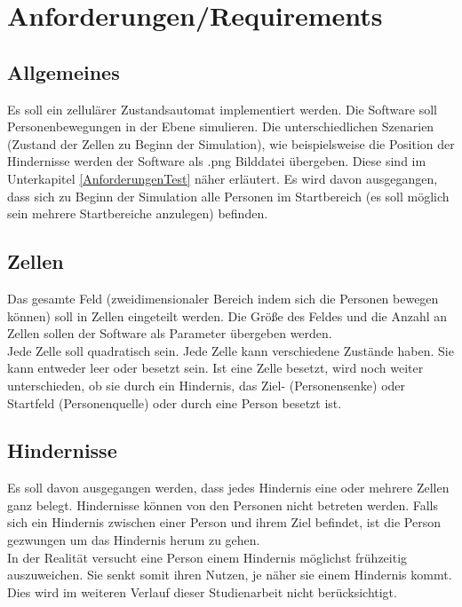 \section{Anforderungen/Requirements}
\label{requirements}

\subsection{Allgemeines}
Es soll ein zellulärer Zustandsautomat implementiert werden. Die Software soll Personenbewegungen in der Ebene simulieren. Die unterschiedlichen Szenarien (Zustand der Zellen zu Beginn der Simulation), wie beispielsweise die Position der Hindernisse werden der Software als .png Bilddatei übergeben. Diese sind im Unterkapitel \ref{AnforderungenTest} näher erläutert. Es wird davon ausgegangen, dass sich zu Beginn der Simulation alle Personen im Startbereich (es soll möglich sein mehrere Startbereiche anzulegen) befinden.



\subsection{Zellen}
Das gesamte Feld (zweidimensionaler Bereich indem sich die Personen bewegen können) soll in Zellen eingeteilt werden. Die Größe des Feldes und die Anzahl an Zellen sollen der Software als Parameter übergeben werden.\\
Jede Zelle soll quadratisch sein. Jede Zelle kann verschiedene Zustände haben. Sie kann entweder leer oder besetzt sein. Ist eine Zelle besetzt, wird noch weiter unterschieden, ob sie durch ein Hindernis, das Ziel- (Personensenke) oder Startfeld (Personenquelle) oder durch eine Person besetzt ist.

\subsection{Hindernisse}
Es soll davon ausgegangen werden, dass jedes Hindernis eine oder mehrere Zellen ganz belegt. Hindernisse können von den Personen nicht betreten werden. Falls sich ein Hindernis zwischen einer Person und ihrem Ziel befindet, ist die Person gezwungen um das Hindernis herum zu gehen. \\
In der Realität versucht eine Person einem Hindernis möglichst frühzeitig auszuweichen. Sie senkt somit ihren Nutzen, je näher sie einem Hindernis kommt. Dies wird im weiteren Verlauf dieser Studienarbeit nicht berücksichtigt.


